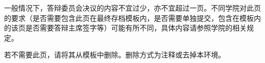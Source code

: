 
\begin{decision}
一般情况下，答辩委员会决议的内容不宜过少，亦不宜超过一页。不同学院对此页的要求（是否需要包含此页在最终存档模板内，是否需要单独提交，包含在模板内的该页是否需要答辩主席签字等）可能有所不同，具体内容请参照学院的相关规定。 

若不需要此页，请将其从模板中删除。删除方式为注释或去掉本环境。
\end{decision}

